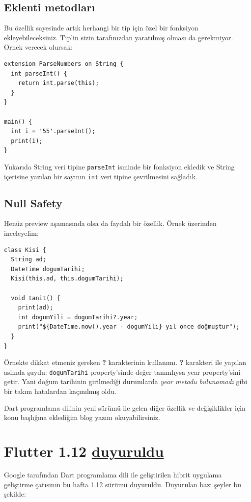 \documentclass[11pt]{article}
\begin{document}
\subsection{Eklenti metodları}
\label{sec:org69caa66}
Bu özellik sayesinde artık herhangi bir tip için özel bir fonksiyon
ekleyebileceksiniz. Tip'in sizin tarafınızdan yaratılmış olması da
gerekmiyor. Örnek verecek olursak:
\begin{verbatim}
extension ParseNumbers on String {
  int parseInt() {
    return int.parse(this);
  }
}

main() {
  int i = '55'.parseInt();
  print(i);
}
\end{verbatim}
Yukarıda String veri tipine \texttt{parseInt} isminde bir fonksiyon ekledik ve String
içerisine yazılan bir sayının \texttt{int} veri tipine çevrilmesini sağladık.
\subsection{Null Safety}
\label{sec:org89f3727}
Henüz preview aşamasında olsa da faydalı bir özellik. Örnek üzerinden
inceleyelim:
\begin{verbatim}
class Kisi {
  String ad;
  DateTime dogumTarihi;
  Kisi(this.ad, this.dogumTarihi);

  void tanit() {
    print(ad);
    int dogumYili = dogumTarihi?.year;
    print("${DateTime.now().year - dogumYili} yıl önce doğmuştur");
  }
}
\end{verbatim}
Örnekte dikkat etmeniz gereken \textbf{?} karakterinin kullanımı. \textbf{?} karakteri ile
yapılan aslında şuydu: \texttt{dogumTarihi} property'sinde değer tanımlıysa year
property'sini getir. Yani doğum tarihinin girilmediği durumlarda \emph{year metodu
bulunamadı} gibi bir takım hatalardan kaçınılmış oldu.


Dart programlama dilinin yeni sürümü ile gelen diğer özellik ve değişiklikler
için konu başlığına eklediğim blog yazını okuyabilirsiniz.
\section{Flutter 1.12 \href{https://medium.com/flutter/announcing-flutter-1-12-what-a-year-22c256ba525d}{duyuruldu}}
\label{sec:orgf1c7129}
Google tarafından Dart programlama dili ile geliştirilen hibrit uygulama
geliştirme çatısının bu hafta 1.12 sürümü duyuruldu. Duyurulan bazı şeyler bu
şekilde:
\end{document}

